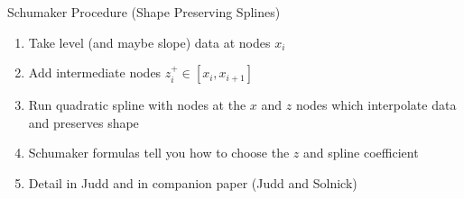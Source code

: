 \documentclass[11pt,handout,xcolor=pdftex,dvipsnames,table,mathserif,aspectratio=169]{beamer}
\begin{document}
\begin{frame}{Schumaker Procedure (Shape Preserving Splines)}
\begin{enumerate}
\item Take level (and maybe slope) data at nodes $x_i$
\item Add intermediate nodes $z_i^{+} \in [x_i,x_{i+1}]$
\item Run quadratic spline with nodes at the $x$ and $z$ nodes which interpolate data and preserves shape
\item Schumaker formulas tell you how to choose the $z$ and spline coefficient
\item Detail in Judd and in companion paper (Judd and Solnick)
\end{enumerate}
\end{frame}
\end{document}
